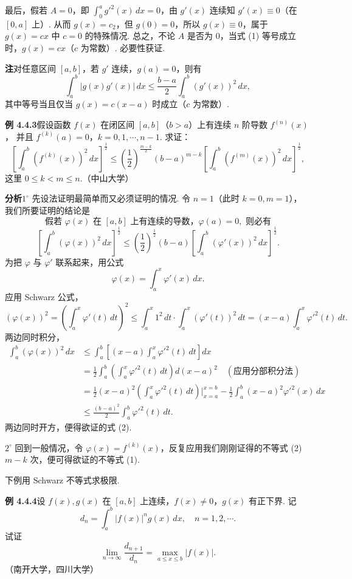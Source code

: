 \documentclass[UTF8,12pt,a4paper,fontset=fandol]{ctexart}
\begin{document}
最后，假若 $A=0$，即 $\displaystyle\int_0^a g'^2(x)\,dx=0$，由 $g'(x)$ 连续知 $g'(x)\equiv0$（在 $[0,a]$ 上）.
从而 $g(x)=c_2$，但 $g(0)=0$，所以 $g(x)\equiv0$，属于 $g(x)=cx$ 中 $c=0$ 的特殊情况.
总之，不论 $A$ 是否为 0，当式 (1) 等号成立时，$g(x)=cx$（$c$ 为常数）. 必要性获证.

\noindent\textbf{注}\quad 对任意区间 $[a,b]$，若 $g'$ 连续，$g(a)=0$，则有
\[
\int_a^b |g(x)g'(x)|\,dx\le\frac{b-a}{2}\int_a^b (g'(x))^2\,dx,
\]
其中等号当且仅当 $g(x)=c(x-a)$ 时成立（$c$ 为常数）.

\noindent\textbf{例 4.4.3}\quad 假设函数 $f(x)$ 在闭区间 $[a,b]$（$b>a$）上有连续 $n$ 阶导数 $f^{(n)}(x)$，
并且 $f^{(k)}(a)=0$，$k=0,1,\cdots,n-1$. 求证：
\[
\left[\int_a^b (f^{(k)}(x))^2\,dx\right]^{\frac12}
\le \left(\frac12\right)^{\frac{m-k}{2}}(b-a)^{m-k}
\left[\int_a^b (f^{(m)}(x))^2\,dx\right]^{\frac12}, \tag{1}
\]
这里 $0\le k<m\le n$.（中山大学）

\noindent\textbf{分析}\quad $1^\circ$ 先设法证明最简单而又必须证明的情况. 令 $n=1$（此时 $k=0,m=1$），
我们所要证明的结论是
\[
\text{假若 }\varphi(x)\text{ 在 }[a,b]\text{ 上有连续的导数，}\varphi(a)=0,\text{ 则必有}
\]
\[
\left[\int_a^b(\varphi(x))^2\,dx\right]^{\frac12}
\le \left(\frac12\right)^{\frac12}(b-a)
\left[\int_a^b(\varphi'(x))^2\,dx\right]^{\frac12}. \tag{2}
\]
为把 $\varphi$ 与 $\varphi'$ 联系起来，用公式
\[
\varphi(x)=\int_a^x\varphi'(x)\,dx.
\]
应用 Schwarz 公式，
\[
(\varphi(x))^2=\left(\int_a^x\varphi'(t)\,dt\right)^2
\le \int_a^x1^2\,dt\cdot\int_a^x(\varphi'(t))^2\,dt
=(x-a)\int_a^x\varphi'^2(t)\,dt. \tag{3}
\]
两边同时积分，
\[
\begin{aligned}
\int_a^b(\varphi(x))^2\,dx
&\le\int_a^b\left[(x-a)\int_a^x\varphi'^2(t)\,dt\right]dx\\
&=\frac12\int_a^b\left(\int_a^x\varphi'^2(t)\,dt\right)d(x-a)^2\quad(\text{应用分部积分法})\\
&=\frac12(x-a)^2\left(\int_a^x\varphi'^2(t)\,dt\right)\bigg|_{x=a}^{x=b}
-\frac12\int_a^b(x-a)^2\varphi'^2(x)\,dx\\
&\le\frac{(b-a)^2}{2}\int_a^b\varphi'^2(t)\,dt.
\end{aligned}
\]
两边同时开方，便得欲证的式 (2).

$2^\circ$ 回到一般情况，令 $\varphi(x)=f^{(k)}(x)$，反复应用我们刚刚证得的不等式 (2) $m-k$ 次，便可得欲证的不等式 (1).

下例用 Schwarz 不等式求极限.

\noindent\textbf{例 4.4.4}\quad 设 $f(x),g(x)$ 在 $[a,b]$ 上连续，$f(x)\ne0$，$g(x)$ 有正下界. 记
\[
d_n=\int_a^b |f(x)|^n g(x)\,dx,\quad n=1,2,\cdots.
\]
试证
\[
\lim_{n\to\infty}\frac{d_{n+1}}{d_n}=\max_{a\le x\le b}|f(x)|.
\]
（南开大学，四川大学）
\end{document}
